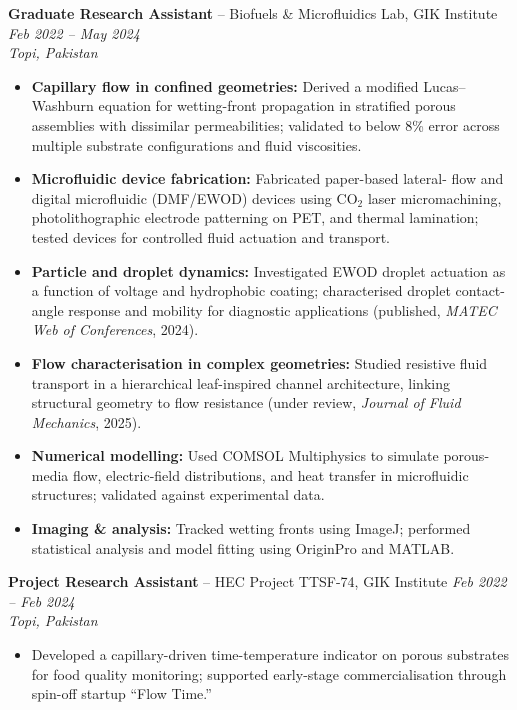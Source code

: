 \documentclass[11pt,a4paper]{article}
\begin{document}
\textbf{Graduate Research Assistant} -- Biofuels \& Microfluidics Lab, GIK
Institute \hfill \textit{Feb 2022 -- May 2024}\\
\textit{Topi, Pakistan}
\begin{itemize}
  \item \textbf{Capillary flow in confined geometries:} Derived a modified
        Lucas--Washburn equation for wetting-front propagation in stratified
        porous assemblies with dissimilar permeabilities; validated to below 8\%
        error across multiple substrate configurations and fluid viscosities.
  \item \textbf{Microfluidic device fabrication:} Fabricated paper-based lateral-
        flow and digital microfluidic (DMF/EWOD) devices using CO$_2$ laser
        micromachining, photolithographic electrode patterning on PET, and thermal
        lamination; tested devices for controlled fluid actuation and transport.
  \item \textbf{Particle and droplet dynamics:} Investigated EWOD droplet
        actuation as a function of voltage and hydrophobic coating; characterised
        droplet contact-angle response and mobility for diagnostic applications
        (published, \textit{MATEC Web of Conferences}, 2024).
  \item \textbf{Flow characterisation in complex geometries:} Studied resistive
        fluid transport in a hierarchical leaf-inspired channel architecture,
        linking structural geometry to flow resistance (under review,
        \textit{Journal of Fluid Mechanics}, 2025).
  \item \textbf{Numerical modelling:} Used COMSOL Multiphysics to simulate
        porous-media flow, electric-field distributions, and heat transfer in
        microfluidic structures; validated against experimental data.
  \item \textbf{Imaging \& analysis:} Tracked wetting fronts using ImageJ;
        performed statistical analysis and model fitting using OriginPro and
        MATLAB.
\end{itemize}

\vspace{4pt}
\textbf{Project Research Assistant} -- HEC Project TTSF-74, GIK Institute
\hfill \textit{Feb 2022 -- Feb 2024}\\
\textit{Topi, Pakistan}
\begin{itemize}
  \item Developed a capillary-driven time-temperature indicator on porous
        substrates for food quality monitoring; supported early-stage
        commercialisation through spin-off startup ``Flow Time.''
\end{itemize}
\end{document}
